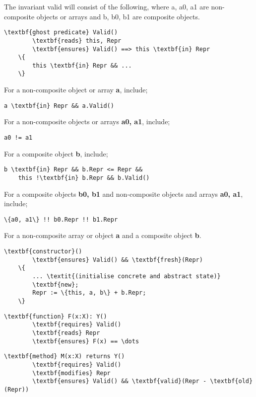 The invariant valid will consist of the following, where a, a0, a1 are non-composite objects or arrays and b, b0, b1 are composite objects.
\begin{Verbatim}[commandchars=\\\{\}]
    \textbf{ghost predicate} Valid()
        \textbf{reads} this, Repr
        \textbf{ensures} Valid() ==> this \textbf{in} Repr
    \{ 
        this \textbf{in} Repr && ...
    \}
\end{Verbatim}

For a non-composite object or array \textbf{a}, include;
\begin{Verbatim}[commandchars=\\\{\}]
    a \textbf{in} Repr && a.Valid()
\end{Verbatim}

For a non-composite objects or arrays \textbf{a0, a1}, include;
\begin{Verbatim}[commandchars=\\\{\}]
    a0 != a1
\end{Verbatim}

For a composite object \textbf{b}, include;
\begin{Verbatim}[commandchars=\\\{\}]
    b \textbf{in} Repr && b.Repr <= Repr && 
    this !\textbf{in} b.Repr && b.Valid()
\end{Verbatim}

For a composite objects \textbf{b0, b1} and non-composite objects and arrays \textbf{a0, a1}, include;
\begin{Verbatim}[commandchars=\\\{\}]
    \{a0, a1\} !! b0.Repr !! b1.Repr  
\end{Verbatim}

For a non-composite array or object \textbf{a} and a composite object \textbf{b}.
\begin{Verbatim}[commandchars=\\\{\}]
    \textbf{constructor}()
        \textbf{ensures} Valid() && \textbf{fresh}(Repr)
    \{
        ... \textit{(initialise concrete and abstract state)}
        \textbf{new};
        Repr := \{this, a, b\} + b.Repr;
    \}
\end{Verbatim}

\begin{Verbatim}[commandchars=\\\{\}]
    \textbf{function} F(x:X): Y()
        \textbf{requires} Valid()
        \textbf{reads} Repr
        \textbf{ensures} F(x) == \dots
\end{Verbatim}

\begin{Verbatim}[commandchars=\\\{\}]
    \textbf{method} M(x:X) returns Y()
        \textbf{requires} Valid()
        \textbf{modifies} Repr
        \textbf{ensures} Valid() && \textbf{valid}(Repr - \textbf{old}(Repr))
\end{Verbatim}